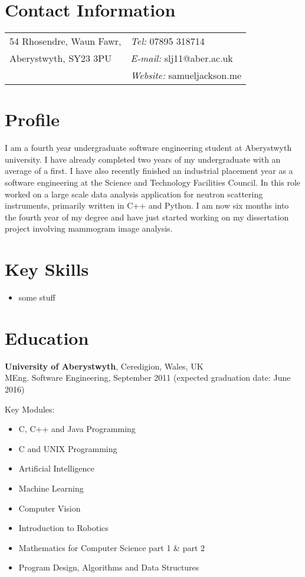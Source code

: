 \documentclass[margin,line]{res}
\begin{document}

\begin{resume}
\section{\sc Contact Information}
\vspace{.05in}
\begin{tabular}{@{}p{2in}p{4in}}
54 Rhosendre, Waun Fawr,             & {\it Tel:}  07895 318714 \\
Aberystwyth, SY23 3PU & {\it E-mail:}  slj11@aber.ac.uk\\
 & {\it Website:} samueljackson.me
\end{tabular}

\section{\sc Profile}
I am a fourth year undergraduate software engineering student at Aberystwyth university. I have already completed two years of my undergraduate with an average of a first. I have also recently finished an industrial placement year as a software engineering at the Science and Technology Facilities Council. In this role worked on a large scale data analysis application for neutron scattering instruments, primarily written in C++ and Python. I am now six months into the fourth year of my degree and have just started working on my dissertation project involving mammogram image analysis.

\section{\sc Key Skills}
\begin{itemize}
\item some stuff
\end{itemize}

\section{\sc Education}
{\bf University of Aberystwyth}, Ceredigion, Wales, UK\\
MEng. Software Engineering, September 2011 (expected graduation date: June 2016)

Key Modules:
\begin{itemize}
\item C, C++ and Java Programming
\item C and UNIX Programming
\item Artificial Intelligence
\item Machine Learning
\item Computer Vision
\item Introduction to Robotics
\item Mathematics for Computer Science part 1 \& part 2
\item Program Design, Algorithms and Data Structures
\end{itemize}


\end{resume}
\end{document}
